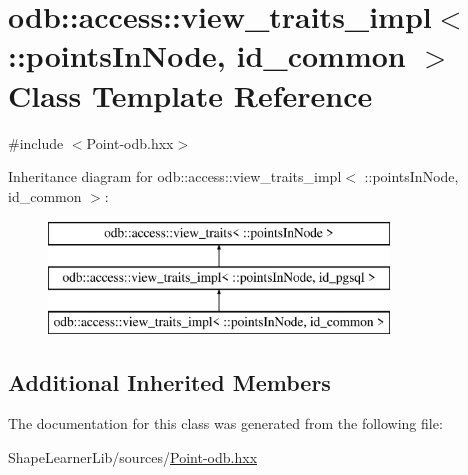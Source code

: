 \hypertarget{classodb_1_1access_1_1view__traits__impl_3_01_1_1points_in_node_00_01id__common_01_4}{}\section{odb\+:\+:access\+:\+:view\+\_\+traits\+\_\+impl$<$ \+:\+:points\+In\+Node, id\+\_\+common $>$ Class Template Reference}
\label{classodb_1_1access_1_1view__traits__impl_3_01_1_1points_in_node_00_01id__common_01_4}


{\ttfamily \#include $<$Point-\/odb.\+hxx$>$}

Inheritance diagram for odb\+:\+:access\+:\+:view\+\_\+traits\+\_\+impl$<$ \+:\+:points\+In\+Node, id\+\_\+common $>$\+:\begin{figure}[H]
\begin{center}
\leavevmode
\includegraphics[height=3.000000cm]{d6/dbc/classodb_1_1access_1_1view__traits__impl_3_01_1_1points_in_node_00_01id__common_01_4}
\end{center}
\end{figure}
\subsection*{Additional Inherited Members}


The documentation for this class was generated from the following file\+:\begin{DoxyCompactItemize}
\item 
Shape\+Learner\+Lib/sources/\hyperlink{_point-odb_8hxx}{Point-\/odb.\+hxx}\end{DoxyCompactItemize}
